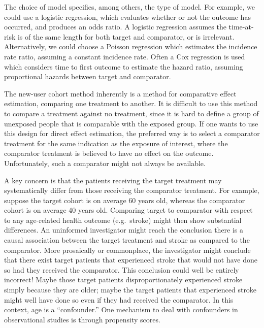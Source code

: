 \documentclass[11pt]{book}
\theoremstyle{definition}
\theoremstyle{definition}
\theoremstyle{definition}
\theoremstyle{remark}
\let\BeginKnitrBlock\begin \let\EndKnitrBlock\end
\begin{document}
The choice of model specifies, among others, the type of model. For example, we could use a logistic regression, which evaluates whether or not the outcome has occurred, and produces an odds ratio. A logistic regression assumes the time-at-risk is of the same length for both target and comparator, or is irrelevant. Alternatively, we could choose a Poisson regression which estimates the incidence rate ratio, assuming a constant incidence rate. Often a Cox regression is used which considers time to first outcome to estimate the hazard ratio, assuming proportional hazards between target and comparator.    

\BeginKnitrBlock{rmdimportant}
The new-user cohort method inherently is a method for comparative effect estimation, comparing one treatment to another. It is difficult to use this method to compare a treatment against no treatment, since it is hard to define a group of unexposed people that is comparable with the exposed group. If one wants to use this design for direct effect estimation, the preferred way is to select a comparator treatment for the same indication as the exposure of interest, where the comparator treatment is believed to have no effect on the outcome. Unfortunately, such a comparator might not always be available.
\EndKnitrBlock{rmdimportant}

A key concern is that the patients receiving the target treatment may systematically differ from those receiving the comparator treatment. For example, suppose the target cohort is on average 60 years old, whereas the comparator cohort is on average 40 years old. Comparing target to comparator with respect to any age-related health outcome (e.g.~stroke) might then show substantial differences. An uninformed investigator might reach the conclusion there is a causal association between the target treatment and stroke as compared to the comparator. More prosaically or commonplace, the investigator might conclude that there exist target patients that experienced stroke that would not have done so had they received the comparator. This conclusion could well be entirely incorrect! Maybe those target patients disproportionately experienced stroke simply because they are older; maybe the target patients that experienced stroke might well have done so even if they had received the comparator. In this context, age is a ``confounder.'' One mechanism to deal with confounders in observational studies is through propensity scores. 
\end{document}
